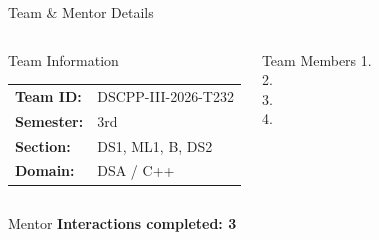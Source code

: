 \documentclass[aspectratio=169,11pt]{beamer}
\begin{document}
\begin{frame}{Team \& Mentor Details}

\begin{columns}[T,totalwidth=\textwidth]


\begin{block}{Team Information}

\begin{tabular}{@{}ll@{}}

\textbf{Team ID:} & DSCPP-III-2026-T232\\
\textbf{Semester:} & 3rd\\
\textbf{Section:} & DS1, ML1, B, DS2   \\
\textbf{Domain:} & DSA / C++

\end{tabular}

\end{block}

\begin{block}{Team Members}
1.\quad {}\\
2.\quad {}\\
3.\quad {}\\
4.\quad {}
\end{block}
\end{columns}
\vspace{2mm}
\begin{block}{Mentor}
\hfill
\textbf{Interactions completed: 3} 
\end{block}
\end{frame}
\end{document}
